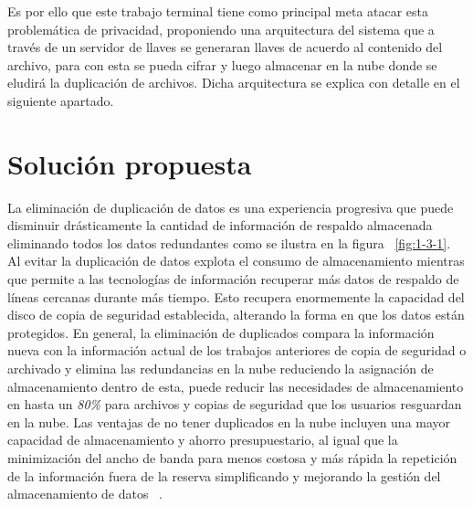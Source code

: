 Es por ello que este trabajo terminal tiene como principal meta atacar esta problemática de privacidad, proponiendo una arquitectura del sistema que a través de un servidor de llaves se generaran llaves de acuerdo al contenido del archivo, para con esta se pueda cifrar y luego almacenar en la nube donde se eludirá la duplicación de archivos. Dicha arquitectura se explica con detalle en el siguiente apartado.

\section{Solución propuesta}
La eliminación de duplicación de datos es una experiencia progresiva que puede disminuir drásticamente la cantidad de información de respaldo almacenada eliminando todos los datos redundantes como se ilustra en la figura ~\ref{fig:1-3-1}. Al evitar la duplicación de datos explota el consumo de almacenamiento mientras que permite a las tecnologías de información recuperar más datos de respaldo de líneas cercanas durante más tiempo. Esto recupera enormemente la capacidad del disco de copia de seguridad establecida, alterando la forma en que los datos están protegidos. En general,
la eliminación de duplicados compara la información nueva con la información actual de los trabajos anteriores de copia de seguridad o archivado y elimina las redundancias en la nube reduciendo la asignación de almacenamiento dentro de esta, puede reducir las necesidades de almacenamiento en hasta un \textit{80\%} para archivos y copias de seguridad que los usuarios resguardan en la nube. Las ventajas de no tener duplicados en la nube incluyen una mayor capacidad de almacenamiento y ahorro presupuestario, al igual que la minimización del ancho de banda para menos costosa y más rápida la repetición de la información fuera de la reserva simplificando y mejorando la gestión del almacenamiento de datos  ~\cite{rededup}. 



